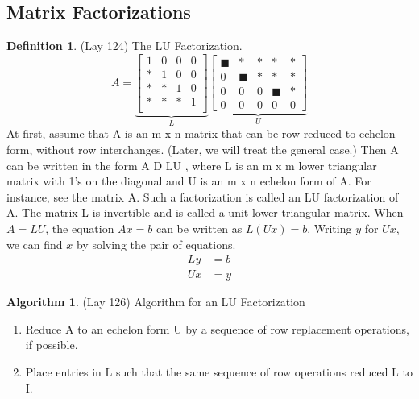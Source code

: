 \documentclass[12pt]{article}
\theoremstyle{definition}
\newtheorem{definition}{Definition} %
\newtheorem{algorithm}{Algorithm}
\numberwithin{equation}{theorem}    %
\begin{document}
\subsection{Matrix Factorizations}

\begin{definition}(Lay 124) The LU Factorization.
    \begin{equation*}
        A=
        \underbrace{
            \begin{bmatrix}
                1 & 0 & 0 & 0 \\
                * & 1 & 0 & 0 \\
                * & * & 1 & 0 \\
                * & * & * & 1 \\
            \end{bmatrix}}_{L}
        \underbrace{
            \begin{bmatrix}
                \blacksquare & *            & * & *            & * \\
                0            & \blacksquare & * & *            & * \\
                0            & 0            & 0 & \blacksquare & * \\
                0            & 0            & 0 & 0            & 0
            \end{bmatrix}}_{U}
    \end{equation*}
    At first, assume that A is an m x n matrix that can be row reduced to echelon form, without row interchanges. (Later, we will treat the general case.) Then A can be written in the form A D LU , where L is an m x m lower triangular matrix with 1’s on the diagonal and U is an m x n echelon form of A. For instance, see the matrix A. Such a factorization is called an LU factorization of A. The matrix L is invertible and is called a unit lower triangular matrix.
    When $A=LU$, the equation $Ax=b$ can be written as $L(Ux)=b$. Writing $y$ for $Ux$, we can find $x$ by solving the pair of equations.
    \begin{align*}
        Ly & =b \\
        Ux & =y
    \end{align*}
\end{definition}

\begin{algorithm} (Lay 126) Algorithm for an LU Factorization
    \begin{enumerate}
        \item Reduce A to an echelon form U by a sequence of row replacement operations, if possible.
        \item Place entries in L such that the same sequence of row operations reduced L to I.
    \end{enumerate}
\end{algorithm}
\end{document}
